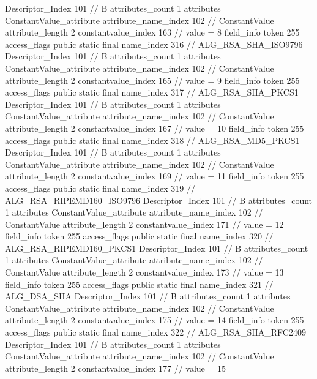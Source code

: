 {{{{{				Descriptor_Index	101		// B
				attributes_count	1
				attributes {
				ConstantValue_attribute {
					attribute_name_index	102		// ConstantValue
					attribute_length	2
					constantvalue_index	163		// value = 8
				}
				}
			}
			field_info {
				token	255
				access_flags	public static final
				name_index	316		// ALG_RSA_SHA_ISO9796
				Descriptor_Index	101		// B
				attributes_count	1
				attributes {
				ConstantValue_attribute {
					attribute_name_index	102		// ConstantValue
					attribute_length	2
					constantvalue_index	165		// value = 9
				}
				}
			}
			field_info {
				token	255
				access_flags	public static final
				name_index	317		// ALG_RSA_SHA_PKCS1
				Descriptor_Index	101		// B
				attributes_count	1
				attributes {
				ConstantValue_attribute {
					attribute_name_index	102		// ConstantValue
					attribute_length	2
					constantvalue_index	167		// value = 10
				}
				}
			}
			field_info {
				token	255
				access_flags	public static final
				name_index	318		// ALG_RSA_MD5_PKCS1
				Descriptor_Index	101		// B
				attributes_count	1
				attributes {
				ConstantValue_attribute {
					attribute_name_index	102		// ConstantValue
					attribute_length	2
					constantvalue_index	169		// value = 11
				}
				}
			}
			field_info {
				token	255
				access_flags	public static final
				name_index	319		// ALG_RSA_RIPEMD160_ISO9796
				Descriptor_Index	101		// B
				attributes_count	1
				attributes {
				ConstantValue_attribute {
					attribute_name_index	102		// ConstantValue
					attribute_length	2
					constantvalue_index	171		// value = 12
				}
				}
			}
			field_info {
				token	255
				access_flags	public static final
				name_index	320		// ALG_RSA_RIPEMD160_PKCS1
				Descriptor_Index	101		// B
				attributes_count	1
				attributes {
				ConstantValue_attribute {
					attribute_name_index	102		// ConstantValue
					attribute_length	2
					constantvalue_index	173		// value = 13
				}
				}
			}
			field_info {
				token	255
				access_flags	public static final
				name_index	321		// ALG_DSA_SHA
				Descriptor_Index	101		// B
				attributes_count	1
				attributes {
				ConstantValue_attribute {
					attribute_name_index	102		// ConstantValue
					attribute_length	2
					constantvalue_index	175		// value = 14
				}
				}
			}
			field_info {
				token	255
				access_flags	public static final
				name_index	322		// ALG_RSA_SHA_RFC2409
				Descriptor_Index	101		// B
				attributes_count	1
				attributes {
				ConstantValue_attribute {
					attribute_name_index	102		// ConstantValue
					attribute_length	2
					constantvalue_index	177		// value = 15
}}}}}}}
